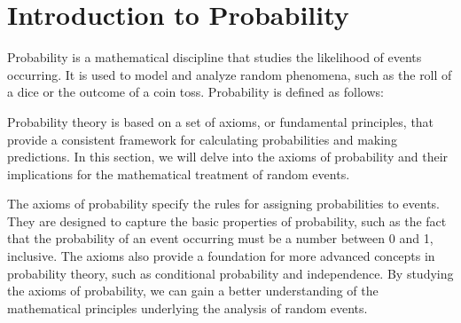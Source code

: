 \documentclass{report}
\begin{document}
        \section{Introduction to Probability}
        Probability is a mathematical discipline that studies the likelihood of events occurring. It is used to model and analyze random phenomena, such as the roll of a dice or the outcome of a coin toss.
        Probability is defined as follows:

        \vspace{.5cm}
         

        Probability theory is based on a set of axioms, or fundamental principles, that provide a consistent framework for calculating probabilities and making predictions. In this section, we will delve into the axioms of probability and their implications for the mathematical treatment of random events.

        The axioms of probability specify the rules for assigning probabilities to events. They are designed to capture the basic properties of probability, such as the fact that the probability of an event occurring must be a number between 0 and 1, inclusive. The axioms also provide a foundation for more advanced concepts in probability theory, such as conditional probability and independence. By studying the axioms of probability, we can gain a better understanding of the mathematical principles underlying the analysis of random events.

\end{document}
